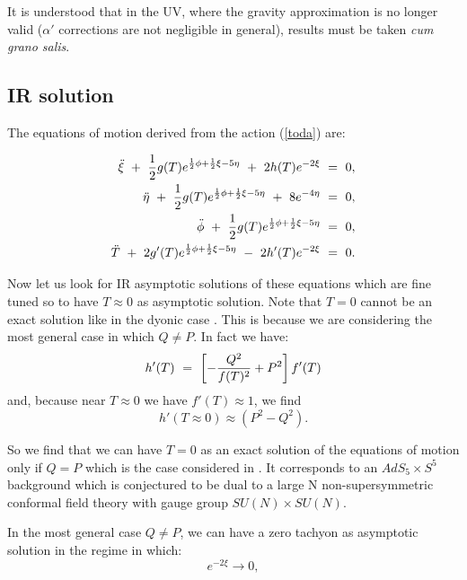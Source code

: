 \documentclass[a4paper,12pt]{article}
\def\half{{1 \over 2}}
\begin{document}
It is understood that in the UV, where the gravity approximation is no longer 
valid ($\alpha'$ corrections are not negligible in general), results must be 
taken {\it cum grano salis}.


\subsection{IR solution}

The equations of motion derived from the action (\ref{toda}) are:

\begin{eqnarray}
\ddot\xi~+~\half g(T)e^{\half\phi+\half\xi-5\eta}~+~2h(T)e^{-2\xi}
~=~0 , \nonumber \\
\ddot\eta~+~\half g(T)e^{\half\phi+\half\xi-5\eta}~+~8e^{-4\eta}~=~0, \nonumber \\
\ddot\phi~+~\half g(T)e^{\half\phi+\half\xi-5\eta}~=~0, \nonumber \\
\ddot T~+~2 g'(T)e^{\half\phi+\half\xi-5\eta}~-~2h'(T)e^{-2\xi}~=~0.
\label{eqmot}
\end{eqnarray}

\noindent Now let us look for IR asymptotic solutions of these equations which are fine tuned so to have $T\approx 0$ as asymptotic solution.
Note that $T=0$  cannot be an exact solution like in the dyonic case \cite{kt1}.
This is because we are considering the most general case in which $Q\ne P$.
In fact we have:
\begin{equation}
h'(T)~=~\left[{-{Q^2\over{f(T)^2}}}+P^2\right] f'(T)
\end{equation}
and, because near $T\approx 0$ we have $f'(T)\approx 1$, we find
\begin{equation}
h'(T\approx 0)\approx(P^2 - Q^2).
\end{equation}

So we find that we can have $T=0$ as an exact solution of the equations of motion only if $Q=P$ which is the case considered in \cite{kt1}. It corresponds to an $AdS_5\times S^5$
background which is conjectured to be dual to a large N non-supersymmetric conformal 
 field theory with gauge group $SU(N)\times SU(N)$.
  
In the most general case $Q\ne P$, we can have a zero tachyon as asymptotic solution  
in the regime in which:
\begin{equation}
e^{-2\xi}\rightarrow 0,
\end{equation}
\end{document}
